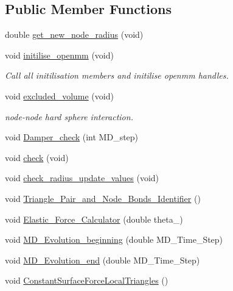 \subsection*{Public Member Functions}
\begin{DoxyCompactItemize}
\item 
double \mbox{\hyperlink{classMembrane_a8a0ab2bcb15628b748a1c8322b8ea803}{get\+\_\+new\+\_\+node\+\_\+radius}} (void)
\item 
void \mbox{\hyperlink{classMembrane_a8ffb572d8b3b2cf07b2cb5e487fbc3b9}{initilise\+\_\+openmm}} (void)
\begin{DoxyCompactList}\small\item\em Call all initilisation members and initilise openmm handles. \end{DoxyCompactList}\item 
void \mbox{\hyperlink{classMembrane_a917057b75f5a7f766eb747daf40a1ef4}{excluded\+\_\+volume}} (void)
\begin{DoxyCompactList}\small\item\em node-\/node hard sphere interaction. \end{DoxyCompactList}\item 
void \mbox{\hyperlink{classMembrane_a86a920d04b19c6df2888c339c4f8cbc6}{Damper\+\_\+check}} (int M\+D\+\_\+step)
\item 
void \mbox{\hyperlink{classMembrane_ae67772a7835b7d550d8e832ae99842fa}{check}} (void)
\item 
void \mbox{\hyperlink{classMembrane_a36d8aa849341471df96ba6cb6462ffc8}{check\+\_\+radius\+\_\+update\+\_\+values}} (void)
\item 
void \mbox{\hyperlink{classMembrane_ad34ca5376368cc72a38b64ed6b0dd386}{Triangle\+\_\+\+Pair\+\_\+and\+\_\+\+Node\+\_\+\+Bonds\+\_\+\+Identifier}} ()
\item 
void \mbox{\hyperlink{classMembrane_aff8b24e17a5e51e8e00f1c1780694d1f}{Elastic\+\_\+\+Force\+\_\+\+Calculator}} (double theta\+\_)
\item 
void \mbox{\hyperlink{classMembrane_a718a254c0f843b06e07d0aad8451b652}{M\+D\+\_\+\+Evolution\+\_\+beginning}} (double M\+D\+\_\+\+Time\+\_\+\+Step)
\item 
void \mbox{\hyperlink{classMembrane_a5292913dd4500db14e26147920a21e58}{M\+D\+\_\+\+Evolution\+\_\+end}} (double M\+D\+\_\+\+Time\+\_\+\+Step)
\item 
void \mbox{\hyperlink{classMembrane_afeb736c81896f74f23e44ceaaa0d1e04}{Constant\+Surface\+Force\+Local\+Triangles}} ()
\item 

\end{DoxyCompactItemize}
